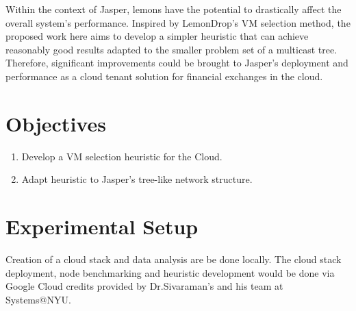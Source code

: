 \documentclass{article}
\begin{document}
Within the context of Jasper, lemons have the potential to drastically affect the overall system's performance.
Inspired by LemonDrop's VM selection method, the proposed work here aims to develop a simpler heuristic that 
can achieve reasonably good results adapted to the smaller problem set of a multicast tree. 
Therefore, significant improvements could be brought to Jasper's deployment and performance as a 
cloud tenant solution for financial exchanges in the cloud.

 
\section{Objectives}
\begin{enumerate}
    \item Develop a VM selection heuristic for the Cloud. 
    \item Adapt heuristic to Jasper's tree-like network structure.
\end{enumerate}

\section{Experimental Setup}
Creation of a cloud stack and data analysis are be done locally. The cloud stack deployment, node benchmarking and
heuristic development would be done via Google Cloud credits provided by Dr.Sivaraman's and his team at Systems@NYU.


    
    
\end{document}

